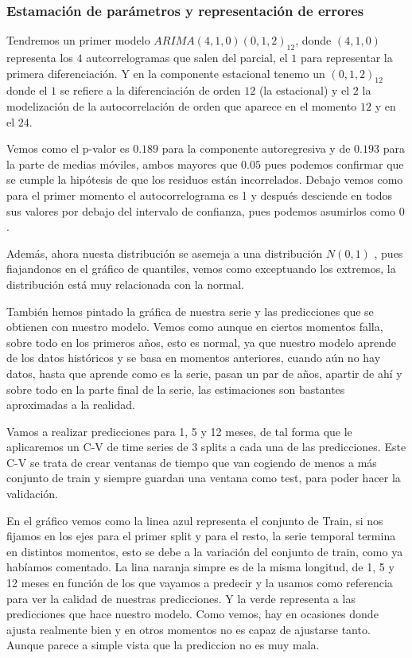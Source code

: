 \documentclass[11pt]{article}
\begin{document}
    \hypertarget{estamaciuxf3n-de-paruxe1metros-y-representaciuxf3n-de-errores}{%
\subsubsection{Estamación de parámetros y representación de
errores}\label{estamaciuxf3n-de-paruxe1metros-y-representaciuxf3n-de-errores}}

Tendremos un primer modelo \(ARIMA(4,1,0)(0,1,2)_{12}\), donde
\((4,1,0)\) representa los \(4\) autcorrelogramas que salen del parcial,
el \(1\) para representar la primera diferenciación. Y en la componente
estacional tenemo un \((0,1,2)_{12}\) donde el \(1\) se refiere a la
diferenciación de orden \(12\) (la estacional) y el \(2\) la
modelización de la autocorrelación de orden que aparece en el momento
\(12\) y en el \(24\).

    Vemos como el p-valor es \(0.189\) para la componente autoregresiva y de
\(0.193\) para la parte de medias móviles, ambos mayores que \(0.05\)
pues podemos confirmar que se cumple la hipótesis de que los residuos
están incorrelados. Debajo vemos como para el primer momento el
autocorrelograma es 1 y después desciende en todos sus valores por
debajo del intervalo de confianza, pues podemos asumirlos como \(0\).

    Además, ahora nuesta distribución se asemeja a una distribución
\(N(0,1)\) , pues fiajandonos en el gráfico de quantiles, vemos como
exceptuando los extremos, la distribución está muy relacionada con la
normal.

    También hemos pintado la gráfica de nuestra serie y las predicciones que
se obtienen con nuestro modelo. Vemos como aunque en ciertos momentos
falla, sobre todo en los primeros años, esto es normal, ya que nuestro
modelo aprende de los datos históricos y se basa en momentos anteriores,
cuando aún no hay datos, hasta que aprende como es la serie, pasan un
par de años, apartir de ahí y sobre todo en la parte final de la serie,
las estimaciones son bastantes aproximadas a la realidad.

    Vamos a realizar predicciones para 1, 5 y 12 meses, de tal forma que le
aplicaremos un C-V de time series de 3 splits a cada una de las
predicciones. Este C-V se trata de crear ventanas de tiempo que van
cogiendo de menos a más conjunto de train y siempre guardan una ventana
como test, para poder hacer la validación.

    En el gráfico vemos como la linea azul representa el conjunto de Train,
si nos fijamos en los ejes para el primer split y para el resto, la
serie temporal termina en distintos momentos, esto se debe a la
variación del conjunto de train, como ya habíamos comentado. La lina
naranja simpre es de la misma longitud, de 1, 5 y 12 meses en función de
los que vayamos a predecir y la usamos como referencia para ver la
calidad de nuestras predicciones. Y la verde representa a las
predicciones que hace nuestro modelo. Como vemos, hay en ocasiones donde
ajusta realmente bien y en otros momentos no es capaz de ajustarse
tanto. Aunque parece a simple vista que la prediccion no es muy mala.
\end{document}
